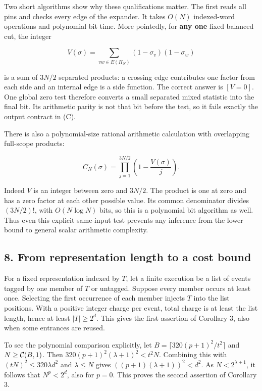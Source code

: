 \documentclass[
  11pt,
]{article}
\newcommand{\ceil}[1]{\lceil #1\rceil}
\begin{document}
Two short algorithms show why these qualifications matter. The first
reads all pins and checks every edge of the expander. It takes \(O(N)\)
indexed-word operations and polynomial bit time. More pointedly, for
\textbf{any one} fixed balanced cut, the integer

\[
V(\sigma)=\sum_{vw\in E(H_N)}(1-\sigma_v)(1-\sigma_w)
\]

is a sum of \(3N/2\) separated products: a crossing edge contributes one
factor from each side and an internal edge is a side function. The
correct answer is \([V=0]\). One global zero test therefore converts a
small separated mixed statistic into the final bit. Its arithmetic
parity is not that bit before the test, so it fails exactly the output
contract in (C).

There is also a polynomial-size rational arithmetic calculation with
overlapping full-scope products:

\[
C_N(\sigma)=\prod_{j=1}^{3N/2}\left(1-\frac{V(\sigma)}j\right).
\tag{I}
\]

Indeed \(V\) is an integer between zero and \(3N/2\). The product is one
at zero and has a zero factor at each other possible value. Its common
denominator divides \((3N/2)!\), with \(O(N\log N)\) bits, so this is a
polynomial bit algorithm as well. Thus even this explicit same-input
test prevents any inference from the lower bound to general scalar
arithmetic complexity.

\subsection{8. From representation length to a cost bound}
For a fixed representation indexed by \(T\), let a finite execution be
a list of events tagged by one member of \(T\) or untagged. Suppose every
member occurs at least once. Selecting the first occurrence of each
member injects \(T\) into the list positions. With a positive integer
charge per event, total charge is at least the list length, hence at
least \(|T|\ge2^d\). This gives the first assertion of Corollary 3,
also when some entrances are reused.

To see the polynomial comparison explicitly, let
\(B=\ceil{320(p+1)^2/t^2}\) and \(N\ge{\cal C}(B,1)\). Then
\(320(p+1)^2(\lambda+1)^2<t^2 N\). Combining this with
\((tN)^2\le320\lambda d^2\) and \(\lambda\le N\) gives
\(((p+1)(\lambda+1))^2<d^2\). As \(N<2^{\lambda+1}\), it follows
that \(N^p<2^d\), also for \(p=0\). This proves the second assertion
of Corollary 3.
\end{document}
